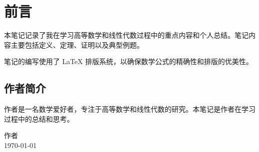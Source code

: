\chapter*{前言}

本笔记记录了我在学习高等数学和线性代数过程中的重点内容和个人总结。笔记内容主要包括定义、定理、证明以及典型例题。

笔记的编写使用了 \LaTeX{} 排版系统，以确保数学公式的精确性和排版的优美性。

\section*{作者简介}

作者是一名数学爱好者，专注于高等数学和线性代数的研究。本笔记是作者在学习过程中的总结和思考。

\begin{flushright}
    作者 \\
    \today
\end{flushright}